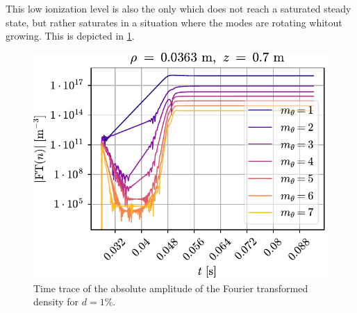 This low ionization level is also the only which does not reach a saturated steady state, but rather saturates in a situation where the modes are rotating whitout growing.
This is depicted in \cref{fig:FFTnn1pct}.
%
\begin{figure}[htb]
    \centering
    \includegraphics{fig/results/neutral/FFTnn1pct}
    \caption{Time trace of the absolute amplitude of the Fourier transformed density for $d=1\%$.}
    \label{fig:FFTnn1pct}
\end{figure}
%


